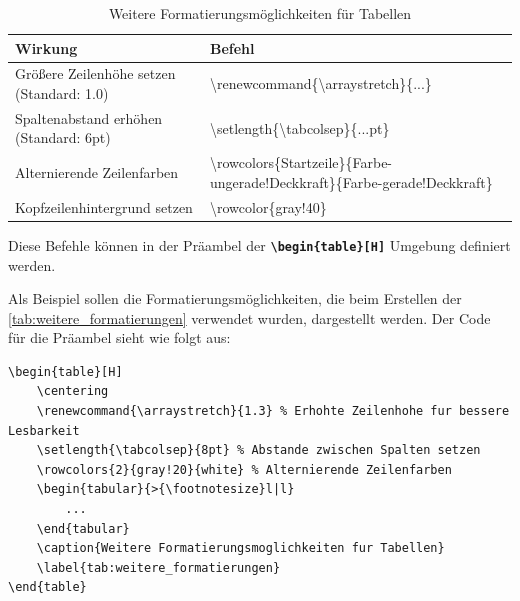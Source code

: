 \begin{table}[H]
    \centering
    \renewcommand{\arraystretch}{1.3} %
    \setlength{\tabcolsep}{8pt} %
    \begin{tabular}{>{\footnotesize}l|l}
        \toprule
        \rowcolor{gray!40} %
        \textbf{Wirkung}                          & \textbf{Befehl}                                                                                           \\
        \midrule
        Größere Zeilenhöhe setzen (Standard: 1.0) & \textbackslash renewcommand\{\textbackslash arraystretch\}\{...\}                                         \\
        Spaltenabstand erhöhen (Standard: 6pt)    & \textbackslash setlength\{\textbackslash tabcolsep\}\{...pt\}                                             \\
        Alternierende Zeilenfarben                & \scriptsize{\textbackslash rowcolors\{Startzeile\}\{Farbe-ungerade!Deckkraft\}\{Farbe-gerade!Deckkraft\}} \\
        Kopfzeilenhintergrund setzen              & \textbackslash rowcolor\{gray!40\}                                                                        \\
        \bottomrule
    \end{tabular}
    \caption{Weitere Formatierungsmöglichkeiten für Tabellen}
    \label{tab:weitere_formatierungen}
\end{table}

Diese Befehle können in der Präambel der \texttt{\textbf{\textbackslash begin\{table\}[H]}} Umgebung definiert werden.

\newpage

Als Beispiel sollen die Formatierungsmöglichkeiten, die beim Erstellen der \autoref{tab:weitere_formatierungen} verwendet wurden, dargestellt werden.
Der Code für die Präambel sieht wie folgt aus:

\begin{lstlisting}[language={[LaTeX]TeX}, basicstyle=\small\ttfamily]
\begin{table}[H]
    \centering
    \renewcommand{\arraystretch}{1.3} % Erhohte Zeilenhohe fur bessere Lesbarkeit
    \setlength{\tabcolsep}{8pt} % Abstande zwischen Spalten setzen
    \rowcolors{2}{gray!20}{white} % Alternierende Zeilenfarben
    \begin{tabular}{>{\footnotesize}l|l}
        ...
    \end{tabular}
    \caption{Weitere Formatierungsmoglichkeiten fur Tabellen}
    \label{tab:weitere_formatierungen}
\end{table}
\end{lstlisting}

